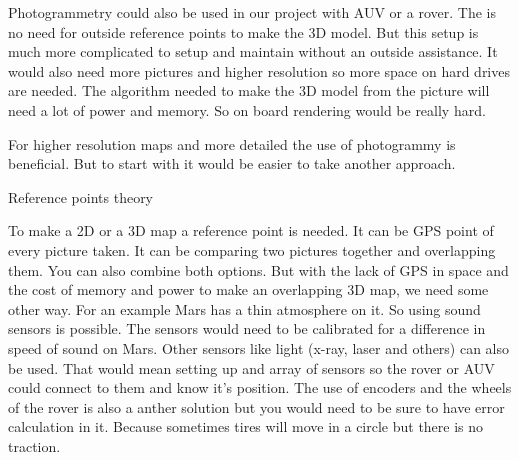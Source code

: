 Photogrammetry could also be used in our project with AUV or a rover. The is no need for outside reference points to make the 3D model. But this setup is much more complicated to setup and maintain without an outside assistance. It would also need more pictures and higher resolution so more space on hard drives are needed. The algorithm needed to make the 3D model from the picture will need a lot of power and memory. So on board rendering would be really hard.

For higher resolution maps and more detailed the use of photogrammy is beneficial. But to start with it would be easier to take another approach.

Reference points theory

To make a 2D or a 3D map a reference point is needed. It can be GPS point of every picture taken. It can be comparing two pictures together and overlapping them. You can also combine both options. But with the lack of GPS in space and the cost of memory and power to make an overlapping 3D map, we need some other way. For an example Mars has a thin atmosphere on it. So using sound sensors is possible. The sensors would need to be calibrated for a difference in speed of sound on Mars. Other sensors like light (x-ray, laser and others) can also be used. That would mean setting up and array of sensors so the rover or AUV could connect to them and know it's position. The use of encoders and the wheels of the rover is also a anther solution but you would need to be sure to have error calculation in it. Because sometimes tires will move in a circle but there is no traction.%




















